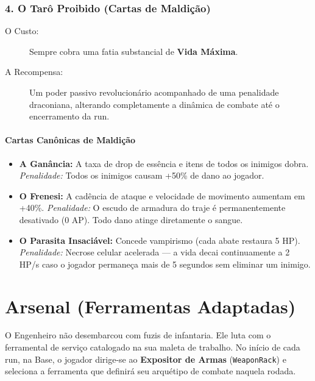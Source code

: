 \documentclass[a4paper,12pt]{report}
\begin{document}
\subsection{4. O Tarô Proibido (Cartas de Maldição)}
\begin{description}
    \item[O Custo:] Sempre cobra uma fatia substancial de \textbf{Vida Máxima}.
    \item[A Recompensa:] Um poder passivo revolucionário acompanhado de uma penalidade draconiana, alterando completamente a dinâmica de combate até o encerramento da run.
\end{description}

\subsubsection{Cartas Canônicas de Maldição}
\begin{itemize}
    \item \textbf{A Ganância:} A taxa de drop de essência e itens de todos os inimigos dobra. \textit{Penalidade:} Todos os inimigos causam +50\% de dano ao jogador.
    \item \textbf{O Frenesi:} A cadência de ataque e velocidade de movimento aumentam em +40\%. \textit{Penalidade:} O escudo de armadura do traje é permanentemente desativado (0 AP). Todo dano atinge diretamente o sangue.
    \item \textbf{O Parasita Insaciável:} Concede vampirismo (cada abate restaura 5 HP). \textit{Penalidade:} Necrose celular acelerada — a vida decai continuamente a 2 HP/s caso o jogador permaneça mais de 5 segundos sem eliminar um inimigo.
\end{itemize}

\chapter{Arsenal (Ferramentas Adaptadas)}\label{cap:arsenal}

O Engenheiro não desembarcou com fuzis de infantaria. Ele luta com o ferramental de serviço catalogado na sua maleta de trabalho. No início de cada run, na Base, o jogador dirige-se ao \textbf{Expositor de Armas} (\texttt{WeaponRack}) e seleciona a ferramenta que definirá seu arquétipo de combate naquela rodada.
\end{document}

